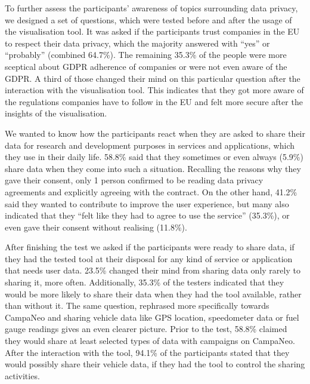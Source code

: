 \documentclass[../paper.tex]{subfiles}
\begin{document}
  To further assess the participants' awareness of topics surrounding data
  privacy, we designed a set of questions, which were tested before and after
  the usage of the visualisation tool. It was asked if the participants trust
  companies in the EU to respect their data privacy, which the majority answered
  with ``yes'' or ``probably'' (combined 64.7\%).
  The remaining 35.3\% of the people were more sceptical about GDPR adherence
  of companies or were not even aware of the GDPR.
  A third of those changed their mind on this particular question after the
  interaction with the visualisation tool. This indicates that they got more
  aware of the regulations companies have to follow in the EU and felt more
  secure after the insights of the visualisation.

  We wanted to know how the participants react when they are asked to share
  their data for research and development purposes in services and applications,
  which they use in their daily life. 58.8\% said that they sometimes or even
  always (5.9\%) share data when they come into such a situation. Recalling
  the reasons why they gave their consent, only 1 person confirmed to be reading
  data privacy agreements and explicitly agreeing with the contract. On the
  other hand, 41.2\% said they wanted to contribute to improve the user
  experience, but many also indicated that they ``felt like they had to agree
  to use the service'' (35.3\%), or even gave their consent without realising
  (11.8\%).

  After finishing the test we asked if the participants were ready to share
  data, if they had the tested tool at their disposal for any kind of service
  or application that needs user data.
  23.5\% changed their mind from sharing data only rarely to sharing it,
  more often. Additionally, 35.3\% of the testers indicated that they would
  be more likely to share their data when they had the tool available,
  rather than without it. The same question, rephrased more specifically
  towards CampaNeo and sharing vehicle data like GPS location,
  speedometer data or fuel gauge readings gives an even clearer picture.
  Prior to the test, 58.8\% claimed they would share at least selected types
  of data with campaigns on CampaNeo. After the interaction with the tool,
  94.1\% of the participants stated that they would possibly share their
  vehicle data, if they had the tool to control the sharing activities.
\end{document}
